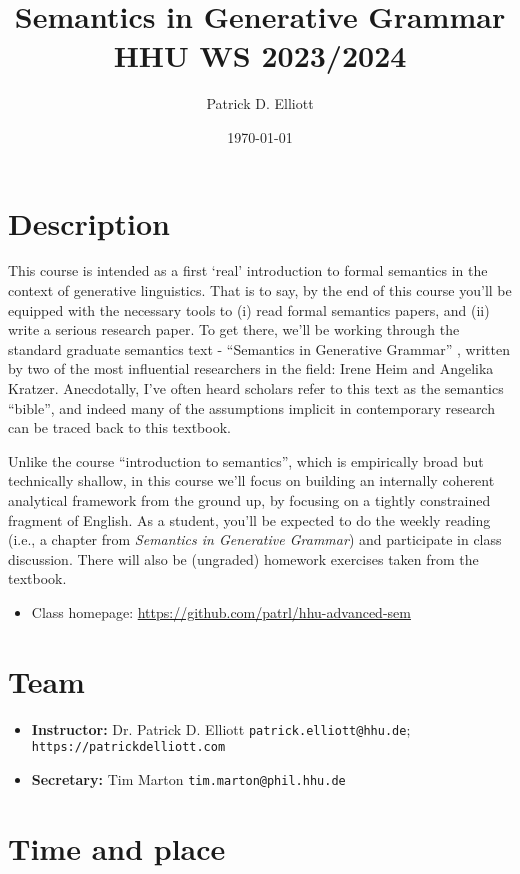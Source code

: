 \documentclass[letterpaper,parskip=half]{scrartcl}
\author{Patrick D. Elliott}
\date{\today}
\title{Semantics in Generative Grammar\\\medskip
\large HHU WS 2023/2024}
\begin{document}
\maketitle
\section{Description}
\label{sec:org110496e}

This course is intended as a first `real' introduction to formal semantics in the context of generative linguistics. That is to say, by the end of this course you'll be equipped with the necessary tools to (i) read formal semantics papers, and (ii) write a serious research paper. To get there, we'll be working through the standard graduate semantics text - ``Semantics in Generative Grammar'' \autocite{HeimKratzer1998}, written by two of the most influential researchers in the field: Irene Heim and Angelika Kratzer. Anecdotally, I've often heard scholars refer to this text as the semantics ``bible'', and indeed many of the assumptions implicit in contemporary research can be traced back to this textbook. 

Unlike the course ``introduction to semantics'', which is empirically broad but technically shallow, in this course we'll focus on building an internally coherent analytical framework from the ground up, by focusing on a tightly constrained fragment of English. As a student, you'll be expected to do the weekly reading (i.e., a chapter from \emph{Semantics in Generative Grammar}) and participate in class discussion. There will also be (ungraded) homework exercises taken from the textbook. 

\begin{itemize}
\item Class homepage: \url{https://github.com/patrl/hhu-advanced-sem}
\end{itemize}
\section{Team}
\label{sec:org2415cec}

\begin{itemize}
\item \textbf{Instructor:} Dr. Patrick D. Elliott \texttt{patrick.elliott@hhu.de}; \texttt{https://patrickdelliott.com}
\item \textbf{Secretary:} Tim Marton \texttt{tim.marton@phil.hhu.de}
\end{itemize}
\section{Time and place}
\label{sec:org412b9fd}
\end{document}
